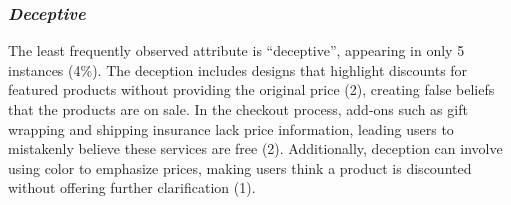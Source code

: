 \subsubsection{\textit{Deceptive}}
The least frequently observed attribute is ``deceptive'', appearing in only 5 instances (4\%). The deception includes designs that highlight discounts for featured products without providing the original price (2), creating false beliefs that the products are on sale. In the checkout process, add-ons such as gift wrapping and shipping insurance lack price information, leading users to mistakenly believe these services are free (2). Additionally, deception can involve using color to emphasize prices, making users think a product is discounted without offering further clarification (1).

